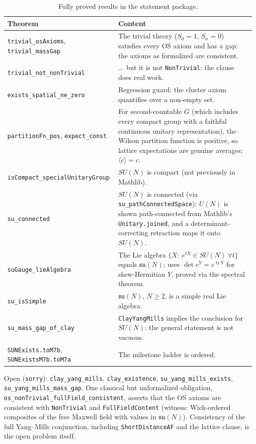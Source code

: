 \documentclass[11pt]{article}
\theoremstyle{definition}
\theoremstyle{remark}
\newcommand{\tr}{\operatorname{tr}}
\newcommand{\lean}[1]{\texttt{\hyphenchar\font=-1\relax #1}}
\begin{document}
\begin{table}[ht]
\centering\small
\begin{tabularx}{\textwidth}{@{}lX@{}}
\toprule
Theorem & Content \\
\midrule
\lean{trivial\_osAxioms}, \lean{trivial\_massGap} & The trivial theory ($S_0=1$, $S_n=0$) satisfies every OS axiom and has a gap: the axioms as formalized are consistent. \\
\lean{trivial\_not\_nonTrivial} & \ldots\ but it is not \lean{NonTrivial}: the clause does real work. \\
\lean{exists\_spatial\_ne\_zero} & Regression guard: the cluster axiom quantifies over a non-empty set. \\
\lean{partitionFn\_pos}, \lean{expect\_const} & For second-countable $G$ (which includes every compact group with a faithful continuous unitary representation), the Wilson partition function is positive, so lattice expectations are genuine averages; $\langle c\rangle=c$. \\
\lean{isCompact\_specialUnitaryGroup} & $SU(N)$ is compact (not previously in Mathlib). \\
\lean{su\_connected} & $SU(N)$ is connected (via \lean{su\_pathConnectedSpace}): $U(N)$ is shown path-connected from Mathlib's \lean{Unitary.joined}, and a determinant-correcting retraction maps it onto $SU(N)$. \\
\lean{suGauge\_lieAlgebra} & The Lie algebra $\{X:\ e^{tX}\in SU(N)\ \forall t\}$ equals $\mathfrak{su}(N)$; uses $\det e^{Y}=e^{\tr Y}$ for skew-Hermitian $Y$, proved via the spectral theorem. \\
\lean{su\_isSimple} & $\mathfrak{su}(N)$, $N\ge2$, is a simple real Lie algebra. \\
\lean{su\_mass\_gap\_of\_clay} & \lean{ClayYangMills} implies the conclusion for $SU(N)$: the general statement is not vacuous. \\
\lean{SUNExists.toM7b}, \lean{SUNExistsM7b.toM7a} & The milestone ladder is ordered. \\
\bottomrule
\end{tabularx}
\caption{Fully proved results in the statement package.}
\label{tab:checked}
\end{table}

\noindent Open (\lean{sorry}): \lean{clay\_yang\_mills}, \lean{clay\_existence},
\lean{su\_yang\_mills\_exists}, \lean{su\_yang\_mills\_\allowbreak mass\_gap}. One classical but unformalized
obligation, \lean{os\_nonTrivial\_\allowbreak fullField\_consistent}, asserts that the OS axioms are
consistent with \lean{NonTrivial} and \lean{FullFieldContent} (witness: Wick-ordered composites
of the free Maxwell field with values in $\mathfrak{su}(N)$). Consistency of the full Yang--Mills
conjunction, including \lean{ShortDistanceAF} and the lattice clause, is the open problem itself.
\end{document}
